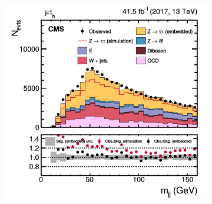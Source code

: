 \begin{figure}[!ht]
\begin{subfigure}[b]{0.33\linewidth}
    \caption*{} 
    \vspace{0.5ex}
  \end{subfigure} 
    \begin{subfigure}[b]{0.33\linewidth}
    \centering
    \includegraphics[width=\linewidth]{Chapitre4/Images/mjj_embed.png} 
    \caption*{} 
    \vspace{0.5ex}
  \end{subfigure} 


\end{figure}
